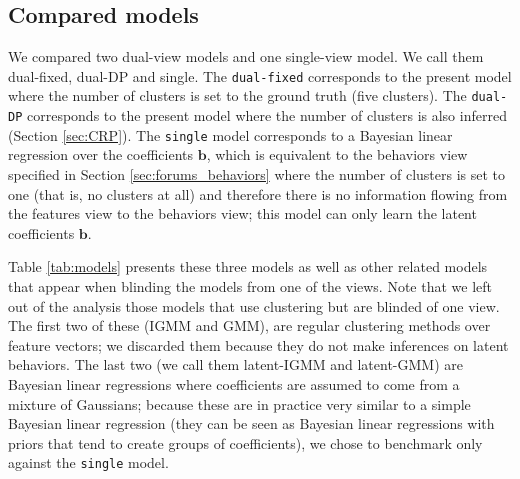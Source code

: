 \documentclass[smallextended]{svjour3}          %
\begin{document}
\subsection{Compared models}
We compared two dual-view models and one single-view model. We call them dual-fixed, dual-DP and single. The \texttt{dual-fixed} corresponds to the present model where the number of clusters is set to the ground truth (five clusters). The \texttt{dual-DP} corresponds to the present model where the number of clusters is also inferred (Section \ref{sec:CRP}). The \texttt{single} model corresponds to a Bayesian linear regression over the coefficients $\mathbf{b}$, which is equivalent to the behaviors view specified in Section \ref{sec:forums_behaviors} where the number of clusters is set to one (that is, no clusters at all) and therefore there is no information flowing from the features view to the behaviors view; this model can only learn the latent coefficients $\mathbf{b}$.

Table \ref{tab:models} presents these three models as well as other related models that appear when blinding the models from one of the views. Note that we left out of the analysis those models that use clustering but are blinded of one view. The first two of these (IGMM and GMM), are regular clustering methods over feature vectors; we discarded them because they do not make inferences on latent behaviors. The last two (we call them latent-IGMM and latent-GMM) are Bayesian linear regressions where coefficients are assumed to come from a mixture of Gaussians; because these are in practice very similar to a simple Bayesian linear regression (they can be seen as Bayesian linear regressions with priors that tend to create groups of coefficients), we chose to benchmark only against the \texttt{single} model.
\end{document}
